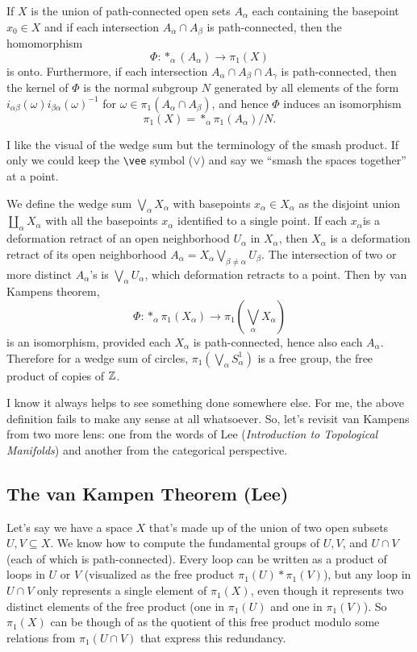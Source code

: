 \begin{theorem}
    If $X$ is the union of path-connected open sets $A_{\alpha}$ each containing the basepoint $x_0\in X$ and if each intersection $A_{\alpha}\cap A_{\beta}$ is path-connected, then the homomorphism \[
        \Phi \colon *_{\alpha}(A_{\alpha}) \to \pi_1(X)
    \] is onto. Furthermore, if each intersection $A_{\alpha}\cap A_{\beta}\cap A_{\gamma}$ is path-connected, then the kernel of $\Phi$ is the normal subgroup $N$ generated by all elements of the form $i_{\alpha\beta}(\omega)i_{\beta\alpha}(\omega)^{-1}$ for $\omega \in \pi_1(A_{\alpha}\cap A_{\beta})$, and hence $\Phi$ induces an isomorphism \[
    \pi_1(X)=*_{\alpha}\pi_1(A_{\alpha}) /N.
    \] 
\end{theorem}
\begin{example}
    I like the visual of the wedge sum but the terminology of the smash product. If only we could keep the \texttt{\textbackslash vee} symbol ($\vee$) and say we ``smash the spaces together'' at a point. 

    We define the wedge sum $\bigvee_{\alpha}X_{\alpha}$ with basepoints $x_{\alpha}\in X_{\alpha}$ as the disjoint union $\amalg_{\alpha}X_{\alpha}$ with all the basepoints $x_{\alpha}$ identified to a single point. If each $x_{\alpha}$is a deformation retract of an open neighborhood $U_{\alpha }$ in $X_{\alpha }$, then $X_{\alpha }$ is a deformation retract of its open neighborhood $A_{\alpha }=X_{\alpha }\bigvee_{\beta\neq\alpha }U_{\beta}$. The intersection of two or more distinct $A_{\alpha }$'s is $\bigvee_{\alpha }U_{\alpha }$, which deformation retracts to a point. Then by van Kampens theorem, \[
        \Phi \colon *_{\alpha }\pi_1(X_{\alpha }) \to \pi_1(\bigvee_{\alpha }X_{\alpha })
    \] is an isomorphism, provided each $X_{\alpha }$ is path-connected, hence also each $A_{\alpha }$. Therefore for a wedge sum of circles, $\pi_1(\bigvee_{\alpha }S_{\alpha }^{1})$ is a free group, the free product of copies of $\mathbb{Z}$.
\end{example}
\orbreak
I know it always helps to see something done somewhere else. For me, the above definition fails to make any sense at all whatsoever. So, let's revisit van Kampens from two more lens: one from the words of Lee (\emph{Introduction to Topological Manifolds}) and another from the categorical perspective.
\subsection{The van Kampen Theorem (Lee)}
Let's say we have a space $X$ that's made up of the union of two open subsets $U,V\subseteq X$. We know how to compute the fundamental groups of $U,V$, and $U\cap V$ (each of which is path-connected). Every loop can be written as a product of loops in $U$ or $V$ (visualized as the free product $\pi_1(U)*\pi_1(V)$), but any loop in $U\cap V$ only represents a single element of $\pi_1(X)$, even though it represents two distinct elements of the free product (one in $\pi_1(U)$ and one in $\pi_1(V)$). So $\pi_1(X)$ can be though of as the quotient of this free product modulo some relations from $\pi_1(U\cap V)$ that express this redundancy.

